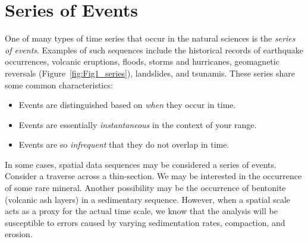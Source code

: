 \section{Series of Events}
\label{sec:seriestest}
	One of many types of time series that occur in the natural sciences is the \emph{series of events}.  
Examples of such sequences include the historical records of earthquake occurrences,  volcanic 
eruptions, floods, storms and hurricanes, geomagnetic reversals (Figure~\ref{fig:Fig1_series}), landslides, and tsunamis.  These series
share some common characteristics:
\begin{itemize}
\item	Events are distinguished based on \emph{when} they occur in time.
\item	Events are essentially \emph{instantaneous} in the context of your range.
\item	Events are so \emph{infrequent} that they do not overlap in time.
\end{itemize}
In some cases, spatial data sequences may be considered a series of events.  Consider a traverse 
across a thin-section.  We may be interested in the occurrence of some rare mineral.  Another 
possibility may be the occurrence of bentonite (volcanic ash layers) in a sedimentary sequence.  
However, when a spatial scale acts as a proxy for the actual time scale, we know that the analysis 
will be susceptible to errors caused by varying sedimentation rates, compaction, and erosion.

